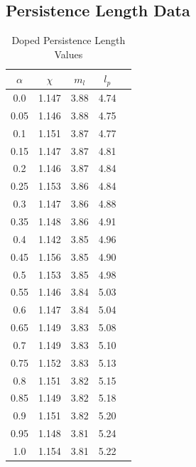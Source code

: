 \subsection{Persistence Length Data}
\begin{table}[hbt!]\centering
\caption{Doped Persistence Length Values}
\label{tab:d_lp}
\renewcommand{\arraystretch}{1.5}
\begin{threeparttable}
\begin{tabular}{ccccc}\toprule
\multicolumn{1}{c}{\multirow{1}{3.5cm}{\centering $\alpha$}} &
\multicolumn{1}{c}{\multirow{1}{1.5cm}{\centering $\chi$}} &
\multicolumn{1}{c}{\multirow{1}{1.5cm}{\centering $m_l$}} &
\multicolumn{1}{c}{\multirow{1}{1.5cm}{\centering $l_p$}} & \\ \midrule
    0.0 & 1.147 & 3.88 & 4.74\\
    0.05 & 1.146 & 3.88 & 4.75\\
    0.1 & 1.151 & 3.87 & 4.77\\
    0.15 & 1.147 & 3.87 & 4.81\\
    0.2 & 1.146 & 3.87 & 4.84\\
    0.25 & 1.153 & 3.86 & 4.84\\
    0.3 & 1.147 & 3.86 & 4.88\\
    0.35 & 1.148 & 3.86 & 4.91\\
    0.4 & 1.142 & 3.85 & 4.96\\
    0.45 & 1.156 & 3.85 & 4.90\\
    0.5 & 1.153 & 3.85 & 4.98\\
    0.55 & 1.146 & 3.84 & 5.03\\
    0.6 & 1.147 & 3.84 & 5.04\\
    0.65 & 1.149 & 3.83 & 5.08\\
    0.7 & 1.149 & 3.83 & 5.10\\
    0.75 & 1.152 & 3.83 & 5.13\\
    0.8 & 1.151 & 3.82 & 5.15\\
    0.85 & 1.149 & 3.82 & 5.18\\
    0.9 & 1.151 & 3.82 & 5.20\\
    0.95 & 1.148 & 3.81 & 5.24\\
    1.0 & 1.154 & 3.81 & 5.22\\ \bottomrule
\end{tabular}
\begin{tablenotes}
\item
\end{tablenotes}
\end{threeparttable}
\end{table}

